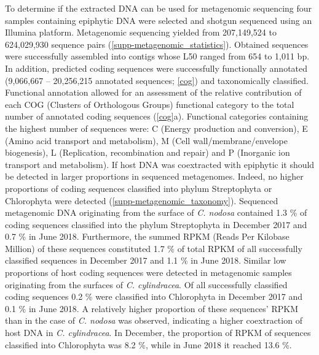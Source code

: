 \documentclass[
  12pt,
]{article}
\begin{document}
To determine if the extracted DNA can be used for metagenomic sequencing
four samples containing epiphytic DNA were selected and shotgun
sequenced using an Illumina platform. Metagenomic sequencing yielded
from 207,149,524 to 624,029,930 sequence pairs
(\autoref{supp-metagenomic_statistics}). Obtained sequences were
successfully assembled into contigs whose L50 ranged from 654 to 1,011
bp. In addition, predicted coding sequences were successfully
functionally annotated (9,066,667 -- 20,256,215 annotated sequences;
\autoref{cog}) and taxonomically classified. Functional annotation
allowed for an assessment of the relative contribution of each COG
(Clusters of Orthologous Groups) functional category to the total number
of annotated coding sequences (\autoref{cog}a). Functional categories
containing the highest number of sequences were: C (Energy production
and conversion), E (Amino acid transport and metabolism), M (Cell
wall/membrane/envelope biogenesis), L (Replication, recombination and
repair) and P (Inorganic ion transport and metabolism). If host DNA was
coextracted with epiphytic it should be detected in larger proportions
in sequenced metagenomes. Indeed, no higher proportions of coding
sequences classified into phylum Streptophyta or Chlorophyta were
detected (\autoref{supp-metagenomic_taxonomy}). Sequenced metagenomic
DNA originating from the surface of \emph{C. nodosa} contained 1.3
\si{\percent} of coding sequences classified into the phylum
Streptophyta in December 2017 and 0.7 \si{\percent} in June 2018.
Furthermore, the summed RPKM (Reads Per Kilobase Million) of these
sequences constituted 1.7 \si{\percent} of total RPKM of all
successfully classified sequences in December 2017 and 1.1 \si{\percent}
in June 2018. Similar low proportions of host coding sequences were
detected in metagenomic samples originating from the surfaces of
\emph{C. cylindracea}. Of all successfully classified coding sequences
0.2 \si{\percent} were classified into Chlorophyta in December 2017 and
0.1 \si{\percent} in June 2018. A relatively higher proportion of these
sequences' RPKM than in the case of \emph{C. nodosa} was observed,
indicating a higher coextraction of host DNA in \emph{C. cylindracea}.
In December, the proportion of RPKM of sequences classified into
Chlorophyta was 8.2 \si{\percent}, while in June 2018 it reached 13.6
\si{\percent}.
\end{document}
